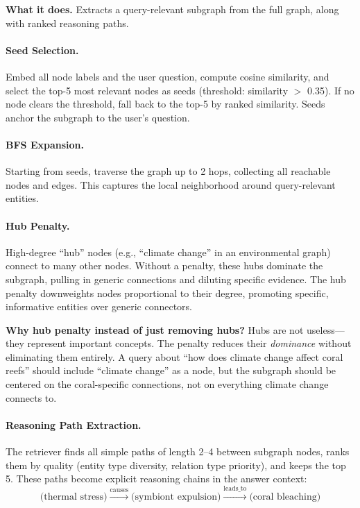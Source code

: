 \documentclass[11pt]{article}
\begin{document}
\textbf{What it does.} Extracts a query-relevant subgraph from the full graph, along with ranked reasoning paths.

\paragraph{Seed Selection.} Embed all node labels and the user question, compute cosine similarity, and select the top-5 most relevant nodes as seeds (threshold: similarity $>$ 0.35). If no node clears the threshold, fall back to the top-5 by ranked similarity. Seeds anchor the subgraph to the user's question.

\paragraph{BFS Expansion.} Starting from seeds, traverse the graph up to 2 hops, collecting all reachable nodes and edges. This captures the local neighborhood around query-relevant entities.

\paragraph{Hub Penalty.} High-degree ``hub'' nodes (e.g., ``climate change'' in an environmental graph) connect to many other nodes. Without a penalty, these hubs dominate the subgraph, pulling in generic connections and diluting specific evidence. The hub penalty downweights nodes proportional to their degree, promoting specific, informative entities over generic connectors.

\textbf{Why hub penalty instead of just removing hubs?} Hubs are not useless---they represent important concepts. The penalty reduces their \emph{dominance} without eliminating them entirely. A query about ``how does climate change affect coral reefs'' should include ``climate change'' as a node, but the subgraph should be centered on the coral-specific connections, not on everything climate change connects to.

\paragraph{Reasoning Path Extraction.} The retriever finds all simple paths of length 2--4 between subgraph nodes, ranks them by quality (entity type diversity, relation type priority), and keeps the top 5. These paths become explicit reasoning chains in the answer context:
\[
\text{(thermal stress)} \xrightarrow{\text{causes}} \text{(symbiont expulsion)} \xrightarrow{\text{leads\_to}} \text{(coral bleaching)}
\]
\end{document}

